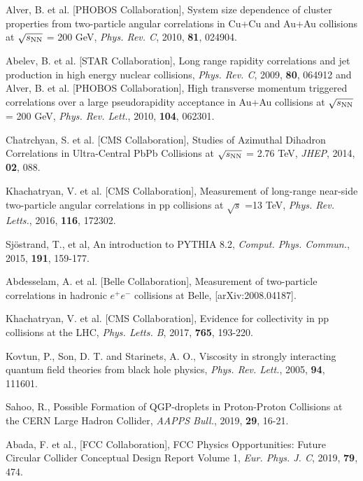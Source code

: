 \documentclass[showpacs,showkeys,aps,twocolumn]{revtex4}
\newcommand\+{\dagger}
\begin{document}
\begin{thebibliography}{99}
Alver, B. et al. [PHOBOS Collaboration], System size dependence of cluster properties from two-particle angular correlations in Cu+Cu and Au+Au collisions at $\sqrt{s_{\rm NN}}$  = 200 GeV, {\it Phys. Rev. C}, 2010, {\bf 81}, 024904. 

Abelev, B. et al. [STAR Collaboration], Long range rapidity correlations and jet production in high energy nuclear collisions, {\it Phys. Rev. C}, 2009, {\bf 80}, 064912 and Alver, B. et al. [PHOBOS Collaboration], High transverse momentum triggered correlations over a large pseudorapidity acceptance in Au+Au collisions at $\sqrt{s_{\rm NN}}$  = 200 GeV, {\it Phys. Rev. Lett.}, 2010, {\bf 104}, 062301. 

Chatrchyan, S. et al. [CMS Collaboration], Studies of Azimuthal Dihadron Correlations in Ultra-Central PbPb Collisions at $\sqrt{s_{\rm NN}}$ = 2.76 TeV, {\it JHEP}, 2014, {\bf 02}, 088. 

Khachatryan, V. et al. [CMS Collaboration], Measurement of long-range near-side two-particle angular correlations in pp collisions at $\sqrt{s}$ =13 TeV, {\it Phys. Rev. Letts.}, 2016, {\bf 116}, 172302. 

Sj\"{o}strand, T., et al, An introduction to PYTHIA 8.2, {\it Comput. Phys. Commun.}, 2015, {\bf 191}, 159-177. 

Abdesselam, A. et al. [Belle Collaboration], Measurement of two-particle correlations in hadronic $e^+e^-$ collisions at Belle, [arXiv:2008.04187].

Khachatryan, V. et al. [CMS Collaboration], Evidence for collectivity in pp collisions at the LHC, {\it Phys. Letts. B}, 2017, {\bf 765}, 193-220.

Kovtun, P., Son, D. T. and Starinets, A. O., Viscosity in strongly interacting quantum field theories from black hole physics, {\it Phys. Rev. Lett.}, 2005, {\bf 94}, 111601. 

Sahoo, R., Possible Formation of QGP-droplets in Proton-Proton Collisions at the CERN Large Hadron Collider, {\it AAPPS Bull.}, 2019, {\bf 29}, 16-21.

Abada, F. et al., [FCC Collaboration], FCC Physics Opportunities: Future Circular Collider Conceptual Design Report Volume 1, {\it Eur. Phys. J. C}, 2019, {\bf 79}, 474.

\end{thebibliography}

  
\end{document}
